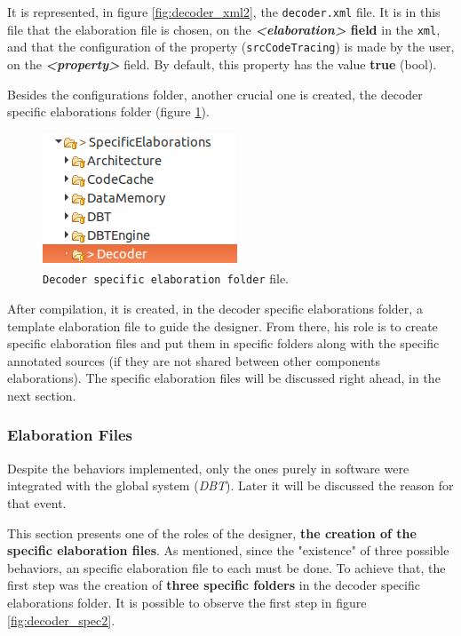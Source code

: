 \documentclass[12pt]{article}
\begin{document}
{It is represented, in figure \ref{fig:decoder_xml2}, the \texttt{decoder.xml} file. It is in this file that the elaboration file is chosen, on the \textbf{\textit{<elaboration>} field} in the \texttt{xml}, and that the configuration of the property (\texttt{srcCodeTracing}) is made by the user, on the\textit{\textbf{ <property>}} field. By default, this property has the value \textbf{true} (bool).

Besides the configurations folder, another crucial one is created, the decoder specific elaborations folder (figure \ref{fig:decoder_spec}).

\begin{figure}[H]
\centerline{
\includegraphics[scale=0.5]{images/decoder3}
}
\caption{\texttt{Decoder specific elaboration folder} file.}
\label{fig:decoder_spec}
\end{figure}

After compilation, it is created, in the decoder specific elaborations folder, a template elaboration file to guide the designer. From there, his role is to create specific elaboration files and put them in specific folders along with the specific annotated sources (if they are not shared between other components elaborations). The specific elaboration files will be discussed right ahead, in the next section.

\subsubsection{Elaboration Files}

Despite the behaviors implemented, only the ones purely in software were integrated with the global system (\textit{DBT}). Later it will be discussed the reason for that event. 

This section presents one of the roles of the designer, \textbf{the creation of the specific elaboration files}. As mentioned, since the "existence" of three possible behaviors, an specific elaboration file to each must be done. To achieve that, the first step was the creation of \textbf{three specific folders} in the decoder specific elaborations folder. It is possible to observe the first step in figure \ref{fig:decoder_spec2}.

}
\end{document}
